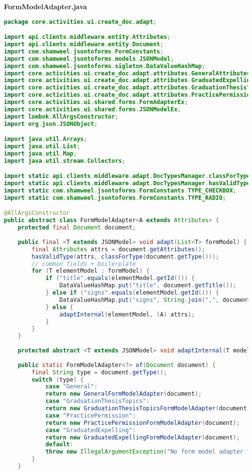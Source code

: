 \textbf{FormModelAdapter.java}
\begin{lstlisting}[language=Java]
package core.activities.ui.create_doc.adapt;

import api.clients.middleware.entity.Attributes;
import api.clients.middleware.entity.Document;
import com.shamweel.jsontoforms.FormConstants;
import com.shamweel.jsontoforms.models.JSONModel;
import com.shamweel.jsontoforms.sigleton.DataValueHashMap;
import core.activities.ui.create_doc.adapt.attributes.GeneralAttributesRetriever;
import core.activities.ui.create_doc.adapt.attributes.GraduatedExpellingAttributesRetriever;
import core.activities.ui.create_doc.adapt.attributes.GraduationThesisTopicsAttributesRetriever;
import core.activities.ui.create_doc.adapt.attributes.PracticePermissionAttributesRetriever;
import core.activities.ui.shared.forms.FormAdapterEx;
import core.activities.ui.shared.forms.JSONModelEx;
import lombok.AllArgsConstructor;
import org.json.JSONObject;

import java.util.Arrays;
import java.util.List;
import java.util.Map;
import java.util.stream.Collectors;

import static api.clients.middleware.adapt.DocTypesManager.classForType;
import static api.clients.middleware.adapt.DocTypesManager.hasValidType;
import static com.shamweel.jsontoforms.FormConstants.TYPE_CHECKBOX;
import static com.shamweel.jsontoforms.FormConstants.TYPE_RADIO;

@AllArgsConstructor
public abstract class FormModelAdapter<A extends Attributes> {
	protected final Document document;
	
	public final <T extends JSONModel> void adapt(List<T> formModel) {
		final Attributes attrs = document.getAttributes();
		hasValidType(attrs, classForType(document.getType()));
		// common fields + boilerplate
		for (T elementModel : formModel) {
			if ("title".equals(elementModel.getId())) {
				DataValueHashMap.put("title", document.getTitle());
			} else if ("signs".equals(elementModel.getId())) {
				DataValueHashMap.put("signs", String.join(",", document.getSignsRequired()));
			} else {
				adaptInternal(elementModel, (A) attrs);
			}
		}
	}
	
	protected abstract <T extends JSONModel> void adaptInternal(T model, A attrs);
	
	public static FormModelAdapter<?> of(Document document) {
		final String type = document.getType();
		switch (type) {
			case "General":
			return new GeneralFormModelAdapter(document);
			case "GraduationThesisTopics":
			return new GraduationThesisTopicsFormModelAdapter(document);
			case "PracticePermission":
			return new PracticePermissionFormModelAdapter(document);
			case "GraduatedExpelling":
			return new GraduatedExpellingFormModelAdapter(document);
			default:
			throw new IllegalArgumentException("No form model adapter for doc with type = " + type);
		}
	}
	

\end{lstlisting}
